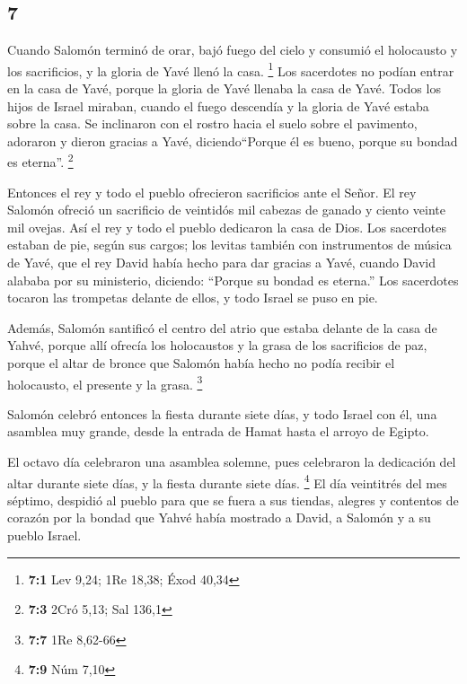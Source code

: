 \begin{paracol}{2}
\hypertarget{section-12}{%
\section{7}\label{section-12}}

 Cuando Salomón terminó de orar, bajó fuego del cielo y
consumió el holocausto y los sacrificios, y la gloria de Yavé llenó la
casa. \footnote{\textbf{7:1} Lev 9,24; 1Re 18,38; Éxod 40,34}
 Los sacerdotes no podían entrar en la casa de Yavé,
porque la gloria de Yavé llenaba la casa de Yavé.  Todos
los hijos de Israel miraban, cuando el fuego descendía y la gloria de
Yavé estaba sobre la casa. Se inclinaron con el rostro hacia el suelo
sobre el pavimento, adoraron y dieron gracias a Yavé, diciendo``Porque
él es bueno, porque su bondad es eterna''. \footnote{\textbf{7:3} 2Cró
  5,13; Sal 136,1}

 Entonces el rey y todo el pueblo ofrecieron sacrificios
ante el Señor.  El rey Salomón ofreció un sacrificio de
veintidós mil cabezas de ganado y ciento veinte mil ovejas. Así el rey y
todo el pueblo dedicaron la casa de Dios.  Los sacerdotes
estaban de pie, según sus cargos; los levitas también con instrumentos
de música de Yavé, que el rey David había hecho para dar gracias a Yavé,
cuando David alababa por su ministerio, diciendo: ``Porque su bondad es
eterna.'' Los sacerdotes tocaron las trompetas delante de ellos, y todo
Israel se puso en pie.

 Además, Salomón santificó el centro del atrio que estaba
delante de la casa de Yahvé, porque allí ofrecía los holocaustos y la
grasa de los sacrificios de paz, porque el altar de bronce que Salomón
había hecho no podía recibir el holocausto, el presente y la grasa.
\footnote{\textbf{7:7} 1Re 8,62-66}

 Salomón celebró entonces la fiesta durante siete días, y
todo Israel con él, una asamblea muy grande, desde la entrada de Hamat
hasta el arroyo de Egipto.

 El octavo día celebraron una asamblea solemne, pues
celebraron la dedicación del altar durante siete días, y la fiesta
durante siete días. \footnote{\textbf{7:9} Núm 7,10}  El
día veintitrés del mes séptimo, despidió al pueblo para que se fuera a
sus tiendas, alegres y contentos de corazón por la bondad que Yahvé
había mostrado a David, a Salomón y a su pueblo Israel.

\hypertarget{la-repetida-apariciuxf3n-de-dios-y-su-respuesta-promesa-y-amenaza-a-la-oraciuxf3n-de-salomuxf3n}{%
}
\end{paracol}
